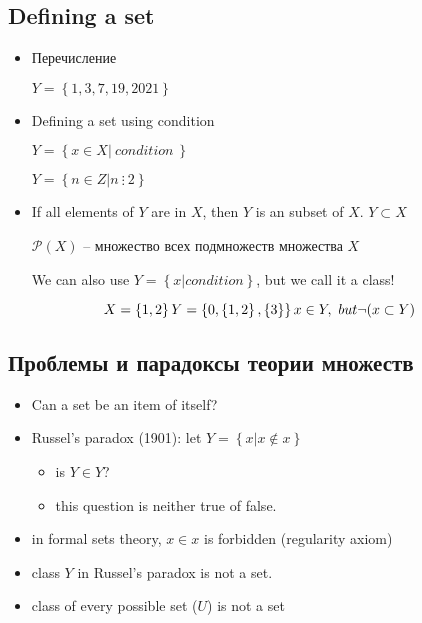 \subsection{Defining a set}

\begin{itemize}
	\item Перечисление
	\begin{example}[]
		$Y= \left\{ 1,3,7,19,2021 \right\} $
	\end{example}
	\item Defining a set using condition

		$Y = \left\{ x \in X | \ condition \ \right\} $

	\begin{example}[]
		$Y = \left\{ n \in Z | n \ \vdots \ 2 \right\} $
	\end{example}

\end{itemize}
	
\begin{itemize}
	\item If all elements of $Y$ are in $X$, then $Y$ is an subset of $X$. $Y \subset X$
	\begin{note}[]
		$\mathcal{P}(X)$ -- множество всех подмножеств множества $X$
	\end{note}
	\begin{note}
		We can also use $Y = \left\{ x | condition \right\} $, but we call it a class!
	\end{note}
\end{itemize}

\[
	X = \left\{ 1, 2 \right\}\\
		Y = \left\{ 0, \left\{ 1, 2 \right\}, \left\{ 3 \right\}   \right\}\\
		x \in Y, \ but \neg(x \subset Y)\\
\]

\subsection{Проблемы и парадоксы теории множеств}
\begin{itemize}
	\item Can a set be an item of itself?
	\item Russel's paradox (1901): let $Y = \left\{ x | x \notin x \right\}$ 
	\begin{itemize}
		\item is $Y \in Y$?
		\item this question is neither true of false.
	\end{itemize}
	\item in formal sets theory, $x \in x$ is forbidden (regularity axiom)
	\item class $Y$ in Russel's paradox is not a set.
	\item class of every possible set ($U$) is not a set
\end{itemize}

